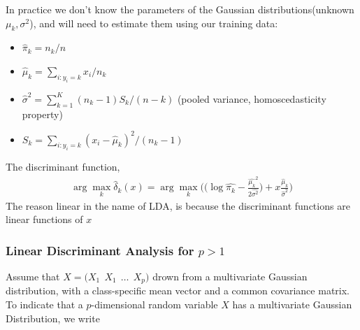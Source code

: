 \documentclass[12pt,a4paper]{article}%
\theoremstyle{definition}
\theoremstyle{plain}
\numberwithin{equation}{section}
\begin{document}
In practice we don't know the parameters of the Gaussian distributions(unknown $\mu_{k}, \sigma^{2}$), and will need to estimate them using our training data:

\begin{itemize}
\item $\hat{\pi}_{k} = n_{k}/n$
\item $\hat{\mu}_{k}=\sum\limits_{i:y_{i}=k}x_{i}/n_{k}$
\item $\hat{\sigma}^{2} = \sum\limits_{k=1}^{K} (n_{k}-1)S_{k}/(n-k)$ (pooled variance, homoscedasticity property)
\item $S_{k} = \sum\limits_{i:y_{i}=k}(x_{i}-\hat{\mu}_{k})^{2}/(n_{k}-1)$
\end{itemize}

The discriminant function,
\begin{gather}
\arg\max_{k}  \hat{\delta}_{k}(x) = \arg\max_{k} \bigg( \big( \log \hat{\pi_{k}} -\frac{\hat{\mu_{k}}^{2}}{2 \hat{\sigma^{2}}} \big) + x \frac{\hat{\mu}_{k}}{\hat{\sigma}^{2}} \bigg)
\label{discriminantfunction}
\end{gather}
The reason linear in the name of LDA, is because the discriminant functions are linear functions of $x$

\subsubsection{\textbf{Linear Discriminant Analysis for $p > 1$}}
Assume that $X = \big( X_{1}~~X_{1}~~\dots~~X_{p} \big)$ drown from a multivariate Gaussian distribution, with a class-specific mean vector and a common covariance matrix.
To indicate that a $p$-dimensional random variable $X$ has a multivariate Gaussian Distribution, we write 
\end{document}

